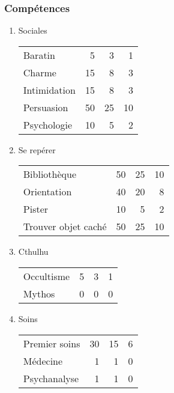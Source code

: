 \documentclass[11pt]{article}
\begin{document}
\begin{twocols}
\subsubsection{Compétences}
\label{sec:org6684f16}
\begin{enumerate}
\item Sociales
\label{sec:org9affb82}

\begin{center}
\begin{tabular}{lrrr}
Baratin & 5 & 3 & 1\\
Charme & 15 & 8 & 3\\
Intimidation & 15 & 8 & 3\\
Persuasion & 50 & 25 & 10\\
Psychologie & 10 & 5 & 2\\
\end{tabular}
\end{center}

\item Se repérer
\label{sec:orge32d4dc}

\begin{center}
\begin{tabular}{lrrr}
Bibliothèque & 50 & 25 & 10\\
Orientation & 40 & 20 & 8\\
Pister & 10 & 5 & 2\\
Trouver objet caché & 50 & 25 & 10\\
\end{tabular}
\end{center}

\item Cthulhu
\label{sec:orgd416a68}

\begin{center}
\begin{tabular}{lrrr}
Occultisme & 5 & 3 & 1\\
Mythos & 0 & 0 & 0\\
\end{tabular}
\end{center}

\item Soins
\label{sec:orgefccedb}

\begin{center}
\begin{tabular}{lrrr}
Premier soins & 30 & 15 & 6\\
Médecine & 1 & 1 & 0\\
Psychanalyse & 1 & 1 & 0\\
\end{tabular}
\end{center}


\end{enumerate}
\end{twocols}
\end{document}
